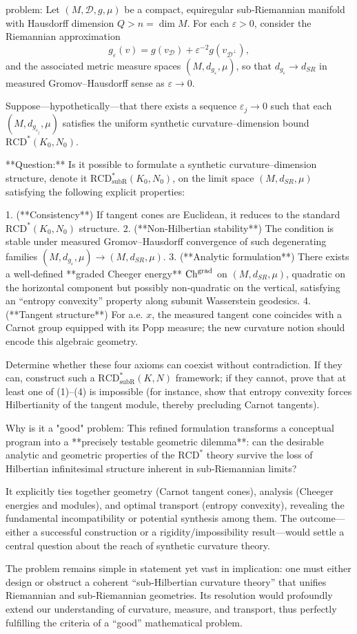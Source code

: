 problem:  
Let \((M,\mathcal{D},g,\mu)\) be a compact, equiregular sub‑Riemannian manifold with Hausdorff dimension \(Q>n=\dim M\).  
For each \(\varepsilon>0\), consider the Riemannian approximation  
\[
g_\varepsilon(v)=g(v_\mathcal{D})+\varepsilon^{-2}g(v_{\mathcal{D}^\perp}),
\]
and the associated metric measure spaces \((M,d_{g_\varepsilon},\mu)\), so that \(d_{g_\varepsilon}\to d_{SR}\) in measured Gromov–Hausdorff sense as \(\varepsilon\to0\).  

Suppose—hypothetically—that there exists a sequence \(\varepsilon_j\to0\) such that each \((M,d_{g_{\varepsilon_j}},\mu)\) satisfies the uniform synthetic curvature–dimension bound \(\mathrm{RCD}^*(K_0,N_0)\).  

**Question:**  
Is it possible to formulate a synthetic curvature–dimension structure, denote it \(\mathrm{RCD}^*_{\mathrm{subR}}(K_0,N_0)\), on the limit space \((M,d_{SR},\mu)\) satisfying the following explicit properties:

1. (**Consistency**) If tangent cones are Euclidean, it reduces to the standard \(\mathrm{RCD}^*(K_0,N_0)\) structure.  
2. (**Non‑Hilbertian stability**) The condition is stable under measured Gromov–Hausdorff convergence of such degenerating families \( (M,d_{g_\varepsilon},\mu)\to (M,d_{SR},\mu) \).  
3. (**Analytic formulation**) There exists a well‑defined **graded Cheeger energy** \({\rm Ch}^{\rm grad}\) on \( (M,d_{SR},\mu)\), quadratic on the horizontal component but possibly non‑quadratic on the vertical, satisfying an “entropy convexity” property along subunit Wasserstein geodesics.  
4. (**Tangent structure**) For a.e. \(x\), the measured tangent cone coincides with a Carnot group equipped with its Popp measure; the new curvature notion should encode this algebraic geometry.  

Determine whether these four axioms can coexist without contradiction.  
If they can, construct such a \( \mathrm{RCD}^*_{\mathrm{subR}}(K,N) \) framework; if they cannot, prove that at least one of (1)–(4) is impossible (for instance, show that entropy convexity forces Hilbertianity of the tangent module, thereby precluding Carnot tangents).  

Why is it a "good" problem:  
This refined formulation transforms a conceptual program into a **precisely testable geometric dilemma**: can the desirable analytic and geometric properties of the \(\mathrm{RCD}^*\) theory survive the loss of Hilbertian infinitesimal structure inherent in sub‑Riemannian limits?  

It explicitly ties together geometry (Carnot tangent cones), analysis (Cheeger energies and modules), and optimal transport (entropy convexity), revealing the fundamental incompatibility or potential synthesis among them. The outcome—either a successful construction or a rigidity/impossibility result—would settle a central question about the reach of synthetic curvature theory.  

The problem remains simple in statement yet vast in implication: one must either design or obstruct a coherent “sub‑Hilbertian curvature theory” that unifies Riemannian and sub‑Riemannian geometries. Its resolution would profoundly extend our understanding of curvature, measure, and transport, thus perfectly fulfilling the criteria of a “good” mathematical problem.